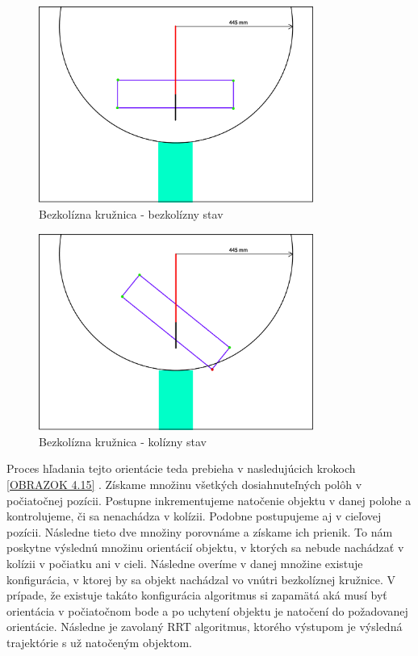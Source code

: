 \begin{figure}[h]
	\centering
	\includegraphics[width=90mm]{img/PREROT-kruznica2.pdf}
	\caption{ Bezkolízna kružnica - bezkolízny stav} \label{OBRAZOK 4.13} 
\end{figure} 

\begin{figure}[h]
	\centering
	\includegraphics[width=90mm]{img/PREROT-kruznica1.pdf}
	\caption{ Bezkolízna kružnica - kolízny stav} \label{OBRAZOK 4.14} 
\end{figure} 

Proces hľadania tejto orientácie teda prebieha v nasledujúcich krokoch \ref{OBRAZOK 4.15} . Získame množinu všetkých dosiahnuteľných polôh v počiatočnej pozícii. Postupne inkrementujeme natočenie objektu v danej polohe a kontrolujeme, či sa nenachádza v kolízii. Podobne postupujeme aj v cieľovej pozícii. Následne tieto dve množiny porovnáme a získame ich prienik. To nám poskytne výslednú množinu orientácií objektu, v ktorých sa nebude nachádzať v kolízii v počiatku ani v cieli. Následne overíme v danej množine existuje konfigurácia, v ktorej by sa objekt nachádzal vo vnútri bezkolíznej kružnice. V prípade, že existuje takáto konfigurácia algoritmus si zapamätá aká musí byť orientácia v počiatočnom bode a po uchytení objektu je natočení do požadovanej orientácie. Následne je zavolaný RRT algoritmus, ktorého výstupom je výsledná trajektórie s už natočeným objektom.

